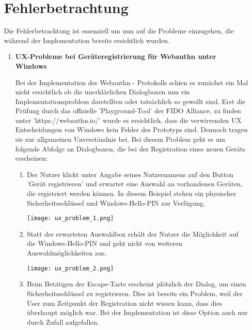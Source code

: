 \section{Fehlerbetrachtung}

Die Fehlerbetrachtung ist essenziell um nun auf die Probleme einzugehen, die während der Implementation bereits ersichtlich wurden.

\begin{enumerate}
\item \textbf{UX-Probleme bei Geräteregistrierung für Webauthn unter Windows}

Bei der Implementation des Webauthn - Protokolls schien es zunächst ein Mal nicht ersichtlich ob die unerklärlichen Dialogboxen nun ein Implementationsproblem darstellten oder tatsächlich so gewollt sind. Erst die Prüfung durch das offizielle 'Playground-Tool' der FIDO Alliance, zu finden unter 'https://webauthn.io/' wurde es ersichtlich, dass die verwirrenden UX Entscheidungen von Windows kein Fehler des Prototyps sind. Dennoch tragen sie zur allgemeinen Unverständnis bei.
Bei diesem Problem geht es um folgende Abfolge an Dialogboxen, die bei der Registration eines neuen Geräts erscheinen:
\newpage

\begin{enumerate}
\item Der Nutzer klickt unter Angabe seines Nutzernamens auf den Button 'Gerät registrieren' und erwartet eine Auswahl an vorhandenen Geräten, die registriert werden können. In diesem Beispiel stehen ein physischer Sicherheitsschlüssel und Windows-Hello-PIN zur Verfügung.

\begin{center}
    \center
    \texttt{[image: ux\_problem\_1.png]}
\end{center}

\item Statt der erwarteten Auswahlbox erhält der Nutzer die Möglichkeit auf die Windows-Hello-PIN und geht nicht von weiteren Auswahlmöglichkeiten aus.

\begin{center}
    \center
    \texttt{[image: ux\_problem\_2.png]}
\end{center}

\item Beim Betätigen der Escape-Taste erscheint plötzlich der Dialog, um einen Sicherheitsschlüssel zu registrieren. Dies ist bereits ein Problem, weil der User zum Zeitpunkt der Registration nicht wissen kann, dass dies überhaupt möglich war. Bei der Implementation ist diese Option auch nur durch Zufall aufgefallen.


\end{enumerate}
\end{enumerate}
